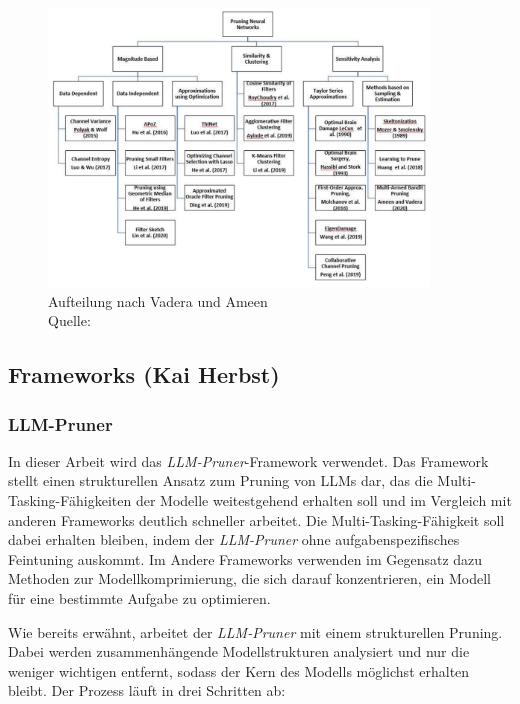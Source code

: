 \begin{figure}[H]
	\centering
	\includegraphics[width=0.9\textwidth]{images/pruning.png}
	\caption[Pruning-Methoden nach Vadera und Ameen]{Aufteilung nach Vadera und Ameen\\Quelle: \cite{vadera2022methods}}
	\label{fig:vadera}
\end{figure}

\subsection{Frameworks (Kai Herbst)}

\subsubsection{LLM-Pruner}

In dieser Arbeit wird das \emph{LLM-Pruner}-Framework verwendet. Das Framework
stellt einen strukturellen Ansatz zum Pruning von LLMs dar, das die
Multi-Tasking-Fähigkeiten der Modelle weitestgehend erhalten soll und im
Vergleich mit anderen Frameworks deutlich schneller arbeitet. Die
Multi-Tasking-Fähigkeit soll dabei erhalten bleiben, indem der \emph{LLM-Pruner}
ohne aufgabenspezifisches Feintuning auskommt. Im Andere Frameworks verwenden im
Gegensatz dazu Methoden zur Modellkomprimierung, die sich darauf konzentrieren,
ein Modell für eine bestimmte Aufgabe zu optimieren.\autocite[Vgl.][]{llmpruner}

Wie bereits erwähnt, arbeitet der \emph{LLM-Pruner} mit einem strukturellen
Pruning. Dabei werden zusammenhängende Modellstrukturen analysiert und nur die
weniger wichtigen entfernt, sodass der Kern des Modells möglichst erhalten
bleibt. Der Prozess läuft in drei Schritten ab:

